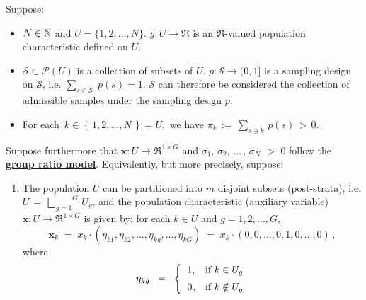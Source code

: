 \begin{proposition}\label{groupRatioYieldsPoststratifiedRatioEstimator}
\mbox{}
\vskip 0.05cm
\noindent
Suppose:
\begin{itemize}
\item
	$N \in \mathbb{N}$ and $U = \{1,2,\ldots,N\}$.
	\vskip 0.05cm
	$y : U \longrightarrow \Re$ is an $\Re$-valued population characteristic defined on $U$.
\item
	$\mathcal{S} \subset \mathcal{P}(U)$ is a collection of subsets of $U$.
	$p : \mathcal{S} \longrightarrow (0,1]$ is a sampling design on $\mathcal{S}$,
	i.e. $\underset{s\in\mathcal{S}}{\sum}\;p(s) = 1$.
	\vskip 0.05cm
	$\mathcal{S}$ can therefore be considered the collection of admissible samples under the sampling design $p$.
\item
	For each \,$k \in \left\{\,1,2,\ldots,N\,\right\} = U$,\, we have
	$\pi_{k} \,:=\, \underset{s \ni k}{\sum}\,p(s) \,>\, 0$.
\end{itemize}
Suppose furthermore that
$\mathbf{x} : U \longrightarrow \Re^{1 \times G}$ and
$\sigma_{1}$, $\sigma_{2}$, $\ldots$\,, $\sigma_{N}$ $>$ $0$
follow the \,\underline{\textbf{{\color{red}group ratio} model}}.
\renewcommand{\theenumi}{\alph{enumi}}
\renewcommand{\labelenumi}{\textnormal{(\theenumi)}$\;\;$}
\vskip 0.1cm
\noindent
Equivalently, but more precisely, suppose:
\begin{enumerate}
\item \vskip -0.25cm
	The population $U$ can be partitioned into $m$ disjoint subsets (post-strata), i.e.
	$U \,=\, \overset{G}{\underset{g=1}{\bigsqcup}}\, U_{g}$, and
	the population characteristic (auxiliary variable)
	$\mathbf{x} : U \longrightarrow \Re^{1 \times G}$ is given by:
	for each $k \in U$ and $g = 1,2,\ldots,G$,
	\begin{equation*}
	\mathbf{x}_{k}
	\; = \; x_{k} \cdot (\eta_{k1},\eta_{k2},\ldots,\eta_{kg},\ldots,\eta_{kG})
	\; = \; x_{k} \cdot (0,0,\ldots,0,1,0,\ldots,0)\,,
	\end{equation*}
	where
	\begin{equation*}
	\eta_{kg}
	\;\; = \;\;
		\left\{\begin{array}{cl}
		1, & \textnormal{if $k \in U_{g}$}
		\\
		\overset{{\color{white}-}}{0}, & \textnormal{if $k \notin U_{g}$}
		\end{array}\right.
	\end{equation*}

\end{enumerate}
\end{proposition}
